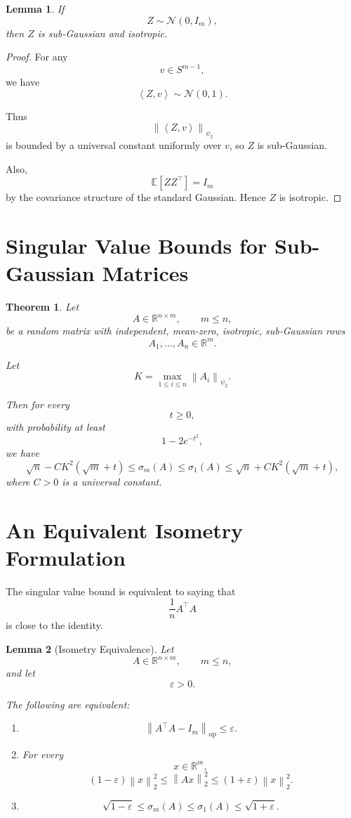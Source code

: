 \documentclass[12pt,oneside]{book}
\numberwithin{equation}{section}
\theoremstyle{definition}
\theoremstyle{plain}
\newtheorem{theorem}{Theorem}[section]
\newtheorem{lemma}{Lemma}[section]
\theoremstyle{remark}
\newcommand{\R}{\mathbb{R}}
\newcommand{\E}{\mathbb{E}}
\newcommand{\norm}[1]{\left\lVert #1 \right\rVert}
\newcommand{\inner}[2]{\left\langle #1, #2 \right\rangle}
\newcommand{\Normal}{\mathcal{N}}
\begin{document}
\begin{lemma}
If
\[
Z\sim \Normal(0,I_m),
\]
then $Z$ is sub-Gaussian and isotropic.
\end{lemma}

\begin{proof}
For any
\[
v\in S^{m-1},
\]
we have
\[
\inner{Z}{v}\sim \Normal(0,1).
\]

Thus
\[
\norm{\inner{Z}{v}}_{\psi_2}
\]
is bounded by a universal constant uniformly over $v$, so $Z$ is sub-Gaussian.

Also,
\[
\E[ZZ^\top]
=
I_m
\]
by the covariance structure of the standard Gaussian. Hence $Z$ is isotropic.
\end{proof}

\section{Singular Value Bounds for Sub-Gaussian Matrices}

\begin{theorem}
Let
\[
A\in\R^{n\times m},
\qquad m\leq n,
\]
be a random matrix with independent, mean-zero, isotropic, sub-Gaussian rows
\[
A_1,\dots,A_n\in\R^m.
\]

Let
\[
K=\max_{1\leq i\leq n}\norm{A_i}_{\psi_2}.
\]

Then for every
\[
t\geq0,
\]
with probability at least
\[
1-2e^{-t^2},
\]
we have
\[
\sqrt{n}-CK^2(\sqrt{m}+t)
\leq
\sigma_m(A)
\leq
\sigma_1(A)
\leq
\sqrt{n}+CK^2(\sqrt{m}+t),
\]
where $C>0$ is a universal constant.
\end{theorem}

\section{An Equivalent Isometry Formulation}

The singular value bound is equivalent to saying that
\[
\frac{1}{n}A^\top A
\]
is close to the identity.

\begin{lemma}[Isometry Equivalence]
Let
\[
A\in\R^{n\times m},
\qquad m\leq n,
\]
and let
\[
\varepsilon>0.
\]

The following are equivalent:
\begin{enumerate}
\item
\[
\norm{A^\top A-I_m}_{\mathrm{op}}\leq \varepsilon.
\]

\item For every
\[
x\in\R^m,
\]
\[
(1-\varepsilon)\norm{x}_2^2
\leq
\norm{Ax}_2^2
\leq
(1+\varepsilon)\norm{x}_2^2.
\]

\item
\[
\sqrt{1-\varepsilon}
\leq
\sigma_m(A)
\leq
\sigma_1(A)
\leq
\sqrt{1+\varepsilon}.
\]
\end{enumerate}
\end{lemma}
\end{document}

